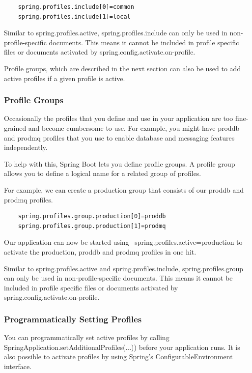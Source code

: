 \documentclass{scrartcl}
\begin{document}
\begin{lstlisting}
    spring.profiles.include[0]=common
    spring.profiles.include[1]=local
\end{lstlisting}

Similar to spring.profiles.active, spring.profiles.include can only be used in non-profile-specific documents. This means it cannot be included in profile specific files or documents activated by spring.config.activate.on-profile.

Profile groups, which are described in the next section can also be used to add active profiles if a given profile is active.

\subsubsection{Profile Groups}

Occasionally the profiles that you define and use in your application are too fine-grained and become cumbersome to use. For example, you might have proddb and prodmq profiles that you use to enable database and messaging features independently.

To help with this, Spring Boot lets you define profile groups. A profile group allows you to define a logical name for a related group of profiles.

For example, we can create a production group that consists of our proddb and prodmq profiles.
\begin{lstlisting}
    spring.profiles.group.production[0]=proddb
    spring.profiles.group.production[1]=prodmq
\end{lstlisting}

Our application can now be started using --spring.profiles.active=production to activate the production, proddb and prodmq profiles in one hit.

Similar to spring.profiles.active and spring.profiles.include, spring.profiles.group can only be used in non-profile-specific documents. This means it cannot be included in profile specific files or documents activated by spring.config.activate.on-profile.

\subsubsection{Programmatically Setting Profiles}

You can programmatically set active profiles by calling SpringApplication.setAdditionalProfiles(...)) before your application runs. It is also possible to activate profiles by using Spring’s ConfigurableEnvironment interface.
\end{document}
